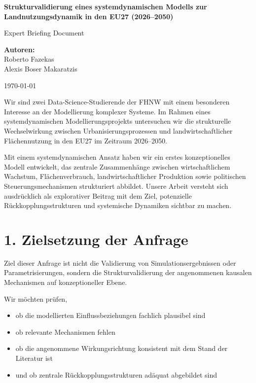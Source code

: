 \documentclass[10pt, a4paper]{article}
\begin{document}
\begin{titlepage}
    \centering
    \vspace*{4cm}
    {\Huge \textbf{Strukturvalidierung eines systemdynamischen Modells zur Landnutzungsdynamik in den EU27 (2026–2050)}\par}
    \vspace{1.5cm}
    {\Large Expert Briefing Document\par}
    
    \vspace{4cm}
    {\large \textbf{Autoren:}\\
    Roberto Fazekas\\
    Alexis Boser Makaratzis\par}
    
    \vfill
    {\large \today\par}
\end{titlepage}

\newpage

\small

Wir sind zwei Data-Science-Studierende der FHNW mit einem besonderen Interesse an der Modellierung komplexer Systeme. Im Rahmen eines systemdynamischen Modellierungsprojekts untersuchen wir die strukturelle Wechselwirkung zwischen Urbanisierungsprozessen und landwirtschaftlicher Flächennutzung in den EU27 im Zeitraum 2026–2050.

Mit einem systemdynamischen Ansatz haben wir ein erstes konzeptionelles Modell entwickelt, das zentrale Zusammenhänge zwischen wirtschaftlichem Wachstum, Flächenverbrauch, landwirtschaftlicher Produktion sowie politischen Steuerungsmechanismen strukturiert abbildet. Unsere Arbeit versteht sich ausdrücklich als explorativer Beitrag mit dem Ziel, potenzielle Rückkopplungsstrukturen und systemische Dynamiken sichtbar zu machen.

\section*{1. Zielsetzung der Anfrage}

Ziel dieser Anfrage ist nicht die Validierung von Simulationsergebnissen oder Parametrisierungen, sondern die Strukturvalidierung der angenommenen kausalen Mechanismen auf konzeptioneller Ebene.

Wir möchten prüfen,
\begin{itemize}[itemsep=0pt, topsep=0pt, leftmargin=*]
    \item ob die modellierten Einflussbeziehungen fachlich plausibel sind
    \item ob relevante Mechanismen fehlen
    \item ob die angenommene Wirkungsrichtung konsistent mit dem Stand der Literatur ist
    \item und ob zentrale Rückkopplungsstrukturen adäquat abgebildet sind
\end{itemize}
\end{document}
